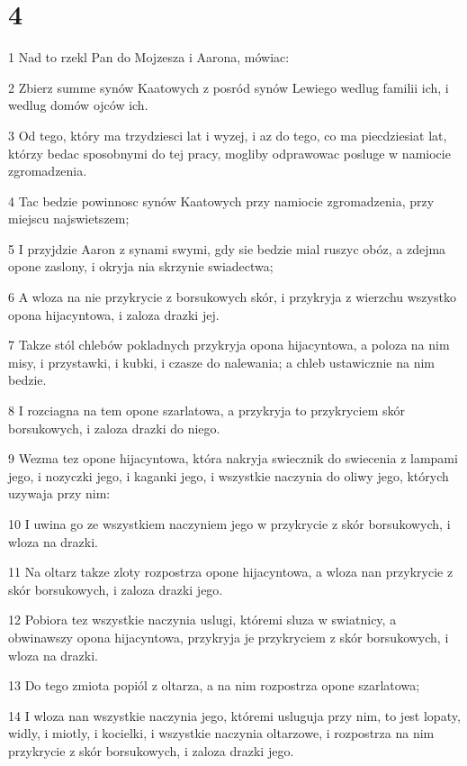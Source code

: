 \chapter{4}

\par 1 Nad to rzekl Pan do Mojzesza i Aarona, mówiac:
\par 2 Zbierz summe synów Kaatowych z posród synów Lewiego wedlug familii ich, i wedlug domów ojców ich.
\par 3 Od tego, który ma trzydziesci lat i wyzej, i az do tego, co ma piecdziesiat lat, którzy bedac sposobnymi do tej pracy, mogliby odprawowac posluge w namiocie zgromadzenia.
\par 4 Tac bedzie powinnosc synów Kaatowych przy namiocie zgromadzenia, przy miejscu najswietszem;
\par 5 I przyjdzie Aaron z synami swymi, gdy sie bedzie mial ruszyc obóz, a zdejma opone zaslony, i okryja nia skrzynie swiadectwa;
\par 6 A wloza na nie przykrycie z borsukowych skór, i przykryja z wierzchu wszystko opona hijacyntowa, i zaloza drazki jej.
\par 7 Takze stól chlebów pokladnych przykryja opona hijacyntowa, a poloza na nim misy, i przystawki, i kubki, i czasze do nalewania; a chleb ustawicznie na nim bedzie.
\par 8 I rozciagna na tem opone szarlatowa, a przykryja to przykryciem skór borsukowych, i zaloza drazki do niego.
\par 9 Wezma tez opone hijacyntowa, która nakryja swiecznik do swiecenia z lampami jego, i nozyczki jego, i kaganki jego, i wszystkie naczynia do oliwy jego, których uzywaja przy nim:
\par 10 I uwina go ze wszystkiem naczyniem jego w przykrycie z skór borsukowych, i wloza na drazki.
\par 11 Na oltarz takze zloty rozpostrza opone hijacyntowa, a wloza nan przykrycie z skór borsukowych, i zaloza drazki jego.
\par 12 Pobiora tez wszystkie naczynia uslugi, któremi sluza w swiatnicy, a obwinawszy opona hijacyntowa, przykryja je przykryciem z skór borsukowych, i wloza na drazki.
\par 13 Do tego zmiota popiól z oltarza, a na nim rozpostrza opone szarlatowa;
\par 14 I wloza nan wszystkie naczynia jego, któremi usluguja przy nim, to jest lopaty, widly, i miotly, i kocielki, i wszystkie naczynia oltarzowe, i rozpostrza na nim przykrycie z skór borsukowych, i zaloza drazki jego.
